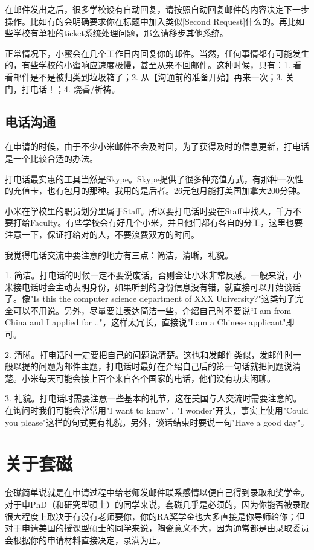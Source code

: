 在邮件发出之后，很多学校设有自动回复，请按照自动回复邮件的内容决定下一步操作。比如有的会明确要求你在标题中加入类似[Second Request]什么的。再比如些学校有单独的ticket系统处理问题，那么请移步其他系统。\par

正常情况下，小蜜会在几个工作日内回复你的邮件。当然，任何事情都有可能发生的，有些学校的小蜜响应速度极慢，甚至从来不回邮件。这种时候，只有：1. 看看邮件是不是被归类到垃圾箱了；2. 从【沟通前的准备开始】再来一次；3. 关门，打电话！；4. 烧香/祈祷。

\subsection{电话沟通}
在申请的时候，由于不少小米邮件不会及时回，为了获得及时的信息更新，打电话是一个比较合适的办法。\par

打电话最实惠的工具当然是Skype。Skype提供了很多种充值方式，有那种一次性的充值卡，也有包月的那种。我用的是后者。26元包月能打美国加拿大200分钟。\par

小米在学校里的职员划分里属于Staff。所以要打电话时要在Staff中找人，千万不要打给Faculty。有些学校会有好几个小米，并且他们都有各自的分工，这里也要注意一下，保证打给对的人，不要浪费双方的时间。\par
     我觉得电话交流中要注意的地方有三点：简洁，清晰，礼貌。 \par 
     1. 简洁。打电话的时候一定不要说废话，否则会让小米非常反感。一般来说，小米接电话时会主动表明身份，如果听到的身份信息没有错，就直接可以开始谈话了。像"Is this the computer science department of XXX University?"这类句子完全可以不用说。另外，尽量要让表达简洁一些，介绍自己时不要说“I am from China and I applied for .."，这样太冗长，直接说"I am a Chinese applicant"即可。\par
     2. 清晰。打电话时一定要把自己的问题说清楚。这也和发邮件类似，发邮件时一般以提的问题为邮件主题，打电话时最好在介绍自己后的第一句话就把问题说清楚。小米每天可能会接上百个来自各个国家的电话，他们没有功夫闲聊。\par
     3. 礼貌。打电话时需要注意一些基本的礼节，这在美国与人交流时需要注意的。在询问时我们可能会常常用"I want to know" , "I wonder"开头，事实上使用"Could you please"这样的句式更有礼貌。另外，谈话结束时要说一句"Have a good day"。

\section{关于套磁}
套磁简单说就是在申请过程中给老师发邮件联系感情以便自己得到录取和奖学金。对于申PhD（和研究型硕士）的同学来说，套磁几乎是必须的，因为你能否被录取很大程度上取决于有没有老师要你，你的RA奖学金也大多直接是你导师给你；但对于申请美国的授课型硕士的同学来说，陶瓷意义不大，因为通常都是由录取委员会根据你的申请材料直接决定，录满为止。\par
